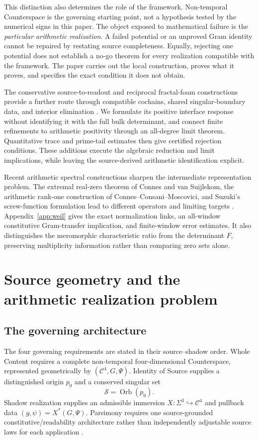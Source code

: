 \documentclass[11pt,letterpaper]{article}
\numberwithin{equation}{section}
\theoremstyle{definition}
\theoremstyle{remark}
\newcommand{\CS}{\mathcal C}
\DeclareMathOperator{\Orb}{Orb}
\begin{document}
This distinction also determines the role of the framework. Non-temporal Counterspace is the governing starting point, not a hypothesis tested by the numerical signs in this paper. The object exposed to mathematical failure is the \emph{particular arithmetic realization}. A failed potential or an unproved Gram identity cannot be repaired by restating source completeness. Equally, rejecting one potential does not establish a no-go theorem for every realization compatible with the framework. The paper carries out the local construction, proves what it proves, and specifies the exact condition it does not obtain.

The conservative source-to-readout and reciprocal fractal-foam constructions provide a further route through compatible cochains, shared singular-boundary data, and interior elimination \cite{tcgsconservative,tcgsfoam}. We formulate its positive interface response without identifying it with the full bulk determinant, and connect finite refinements to arithmetic positivity through an all-degree limit theorem. Quantitative trace and prime-tail estimates then give certified rejection conditions. These additions execute the algebraic reduction and limit implications, while leaving the source-derived arithmetic identification explicit.

Recent arithmetic spectral constructions sharpen the intermediate representation problem. The extremal real-zero theorem of Connes and van Suijlekom, the arithmetic rank-one construction of Connes--Consani--Moscovici, and Suzuki's screw-function formulation lead to different operators and limiting targets \cite{connesvansuijlekom2025,connesconsanim2025,suzuki2023,suzuki2026}. Appendix~\ref{app:weil} gives the exact normalization links, an all-window constitutive Gram-transfer implication, and finite-window error estimates. It also distinguishes the meromorphic characteristic ratio from the determinant $F$, preserving multiplicity information rather than comparing zero sets alone.

\section{Source geometry and the arithmetic realization problem}
\label{sec:framework}
\subsection{The governing architecture}
The four governing requirements are stated in their source--shadow order. Whole Content requires a complete non-temporal four-dimensional Counterspace, represented geometrically by $(\CS^4,G,\Psi)$. Identity of Source supplies a distinguished origin $p_0$ and a conserved singular set
\begin{equation}
 \mathcal S=\Orb(p_0).
 \label{eq:singular}
\end{equation}
Shadow realization supplies an admissible immersion $X:\Sigma^3\hookrightarrow\CS^4$ and pullback data $(g,\psi)=X^*(G,\Psi)$. Parsimony requires one source-grounded constitutive/readability architecture rather than independently adjustable source laws for each application \cite{tcgsfoundation}.
\end{document}
